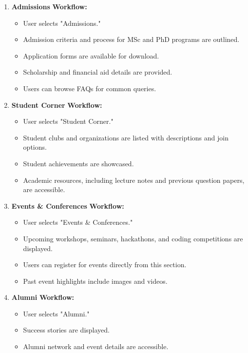 \documentclass[11pt]{article}
\begin{document}
\begin{enumerate}
    \item \textbf{Admissions}
    \textbf{Workflow:}
    \begin{itemize}
        \item User selects "Admissions."
        \item Admission criteria and process for MSc and PhD programs are outlined.
        \item Application forms are available for download.
        \item Scholarship and financial aid details are provided.
        \item Users can browse FAQs for common queries.
    \end{itemize}

    \item \textbf{Student Corner}
    \textbf{Workflow:}
    \begin{itemize}
        \item User selects "Student Corner."
        \item Student clubs and organizations are listed with descriptions and join options.
        \item Student achievements are showcased.
        \item Academic resources, including lecture notes and previous question papers, are accessible.
    \end{itemize}

    \item \textbf{Events \& Conferences}
    \textbf{Workflow:}
    \begin{itemize}
        \item User selects "Events \& Conferences."
        \item Upcoming workshops, seminars, hackathons, and coding competitions are displayed.
        \item Users can register for events directly from this section.
        \item Past event highlights include images and videos.
    \end{itemize}

    \item \textbf{Alumni}
    \textbf{Workflow:}
    \begin{itemize}
        \item User selects "Alumni."
        \item Success stories are displayed.
        \item Alumni network and event details are accessible.
    \end{itemize}


\end{enumerate}
\end{document}
